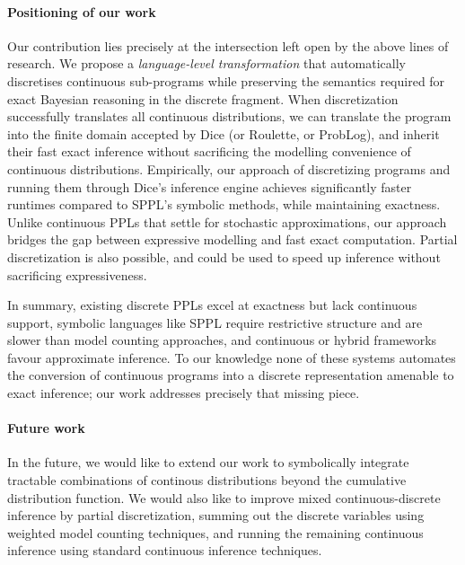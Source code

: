 \documentclass[acmsmall,screen,dvipsnames,x11names,nonacm,anonymous,review]{acmart}
\begin{document}
\paragraph{Positioning of our work}  
Our contribution lies precisely at the intersection left open by the above lines of research. We propose a \emph{language-level transformation} that automatically discretises continuous sub-programs while preserving the semantics required for exact Bayesian reasoning in the discrete fragment. When discretization successfully translates all continuous distributions, we can translate the program into the finite domain accepted by Dice (or Roulette, or ProbLog), and inherit their fast exact inference without sacrificing the modelling convenience of continuous distributions. 
Empirically, our approach of discretizing programs and running them through Dice's inference engine achieves significantly faster runtimes compared to SPPL's symbolic methods, while maintaining exactness. Unlike continuous PPLs that settle for stochastic approximations, our approach bridges the gap between expressive modelling and fast exact computation. Partial discretization is also possible, and could be used to speed up inference without sacrificing expressiveness.

\medskip  
In summary, existing discrete PPLs excel at exactness but lack continuous support, symbolic languages like SPPL require restrictive structure and are slower than model counting approaches, and continuous or hybrid frameworks favour approximate inference. To our knowledge none of these systems automates the conversion of continuous programs into a discrete representation amenable to exact inference; our work addresses precisely that missing piece.

\paragraph{Future work}
In the future, we would like to extend our work to symbolically integrate tractable combinations of continous distributions beyond the cumulative distribution function.
We would also like to improve mixed continuous-discrete inference by partial discretization, summing out the discrete variables using weighted model counting techniques, and running the remaining continuous inference using standard continuous inference techniques.



\end{document}
